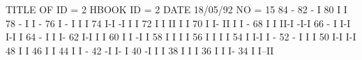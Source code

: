 \begin{Listing}
 TITLE OF ID = 2                                                                 
 HBOOK     ID =         2                                        DATE  18/05/92              NO =    15
       84                                                                               -
       82                                                                             - I
       80                                                                             I I
       78                                                                       -     I I  -
       76                                                                       I -   I I  I
       74                                                                       I-I  -I I  I
       72                                                                       I I  II I  I
       70                                                                       I I- II I  I -
       68                                                                       I  I II-I -I-I
       66                                                                    -  I  I-I  I-I  I
       64                                                                  - I  I            I-
       62                                                                  I-I  I             I
       60                                                                  I I -I             I
       58                                                                  I I I              I
       56                                                                  I I I              I
       54                                                                  I I-I              I -
       52                                                                - I                  I I
       50                                                                I-I                  I-I
       48                                                                I                      I
       46                                                                I                      I
       44                                                                I                      I   -
       42                                                               -I                      I-  I
       40                                                              -I                        I  I
       38                                                              I                         I  I
       36                                                              I                         I  I-
       34                                                              I                         I--II

\end{Listing}
